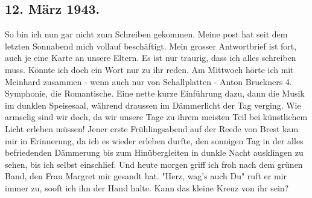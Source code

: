 \subsection{12. M\"{a}rz 1943.}

So bin ich nun gar nicht zum Schreiben gekommen.
Meine post hat seit dem letzten Sonnabend mich vollauf besch\"{a}ftigt.
Mein grosser Antwortbrief ist fort, auch je eine Karte an unsere Eltern.
Es ist nur traurig, dass ich alles schreiben muss.
K\"{o}nnte ich doch ein Wort nur zu ihr reden.
Am Mittwoch h\"{o}rte ich mit Meinhard zusammen - wenn auch nur von Schallplatten - Anton Bruckners 4. Symphonie, die Romantische.
Eine nette kurze Einf\"{u}hrung dazu, dann die Musik im dunklen Speisesaal, w\"{a}hrend draussen im D\"{a}mmerlicht der Tag verging.
Wie armselig sind wir doch, da wir unsere Tage zu ihrem meisten Teil bei k\"{u}nstlichem Licht erleben m\"{u}ssen!
Jener erste Fr\"{u}hlingsabend auf der Reede von Brest kam mir in Erinnerung, da ich es wieder erleben durfte, den sonnigen Tag in der alles befriedenden D\"{a}mmerung bis zum Hin\"{u}bergleiten in dunkle Nacht ausklingen zu sehen, bis ich selbst einschlief.
Und heute morgen griff ich froh nach dem gr\"{u}nen Band, den Frau Margret mir gesandt hat.
"Herz, wag's auch Du" ruft er mir immer zu, sooft ich ihn der Hand halte.
Kann das kleine Kreuz von ihr sein?

\clearpage
